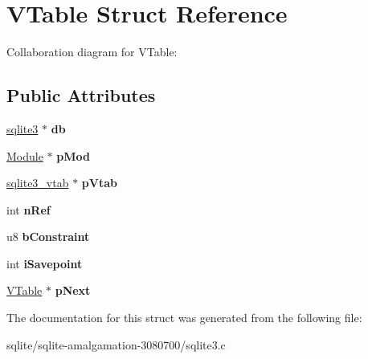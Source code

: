 \hypertarget{struct_v_table}{\section{V\+Table Struct Reference}
\label{struct_v_table}
}


Collaboration diagram for V\+Table\+:
\subsection*{Public Attributes}
\begin{DoxyCompactItemize}
\item 
\hypertarget{struct_v_table_a855b43c118d693910e9060cc9d9ac91a}{\hyperlink{structsqlite3}{sqlite3} $\ast$ {\bfseries db}}\label{struct_v_table_a855b43c118d693910e9060cc9d9ac91a}

\item 
\hypertarget{struct_v_table_ae444452a7168e2f4224a75768abe8312}{\hyperlink{struct_module}{Module} $\ast$ {\bfseries p\+Mod}}\label{struct_v_table_ae444452a7168e2f4224a75768abe8312}

\item 
\hypertarget{struct_v_table_ae15b9cb002c013019dcbac919bda9ac8}{\hyperlink{structsqlite3__vtab}{sqlite3\+\_\+vtab} $\ast$ {\bfseries p\+Vtab}}\label{struct_v_table_ae15b9cb002c013019dcbac919bda9ac8}

\item 
\hypertarget{struct_v_table_a12ffe156e5e8e7d19ed029ccfe4ab5dc}{int {\bfseries n\+Ref}}\label{struct_v_table_a12ffe156e5e8e7d19ed029ccfe4ab5dc}

\item 
\hypertarget{struct_v_table_a5a970416a76dbe3be500c9458c89550d}{u8 {\bfseries b\+Constraint}}\label{struct_v_table_a5a970416a76dbe3be500c9458c89550d}

\item 
\hypertarget{struct_v_table_a19f1c6c5f5fedabba7e605bbe15358e4}{int {\bfseries i\+Savepoint}}\label{struct_v_table_a19f1c6c5f5fedabba7e605bbe15358e4}

\item 
\hypertarget{struct_v_table_af3cac5e5a38508d0111acb9aa6c5f435}{\hyperlink{struct_v_table}{V\+Table} $\ast$ {\bfseries p\+Next}}\label{struct_v_table_af3cac5e5a38508d0111acb9aa6c5f435}

\end{DoxyCompactItemize}


The documentation for this struct was generated from the following file\+:\begin{DoxyCompactItemize}
\item 
sqlite/sqlite-\/amalgamation-\/3080700/sqlite3.\+c\end{DoxyCompactItemize}
